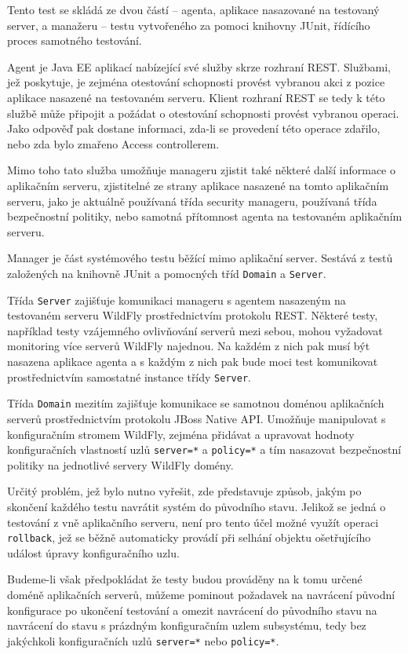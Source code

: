 Tento test se skládá ze dvou částí -- agenta, aplikace nasazované na testovaný server, a manažeru -- testu vytvořeného za pomoci knihovny JUnit, řídícího proces samotného testování.

Agent je Java EE aplikací nabízející své služby skrze rozhraní REST. Službami, jež poskytuje, je zejména otestování schopnosti provést vybranou akci z pozice aplikace nasazené na testovaném serveru. Klient rozhraní REST se tedy k této službě může připojit a požádat o otestování schopnosti provést vybranou operaci. Jako odpověď pak dostane informaci, zda-li se provedení této operace zdařilo, nebo zda bylo zmařeno Access controllerem.

Mimo toho tato služba umožňuje manageru zjistit také některé další informace o aplikačním serveru, zjistitelné ze strany aplikace nasazené na tomto aplikačním serveru, jako je aktuálně používaná třída security manageru, používaná třída bezpečnostní politiky, nebo samotná přítomnost agenta na testovaném aplikačním serveru.

Manager je část systémového testu běžící mimo aplikační server. Sestává z testů založených na knihovně JUnit a pomocných tříd {\tt Domain} a {\tt Server}.

Třída {\tt Server} zajišťuje komunikaci manageru s agentem nasazeným na testovaném serveru WildFly prostřednictvím protokolu REST. Některé testy, například testy vzájemného ovlivňování serverů mezi sebou, mohou vyžadovat monitoring více serverů WildFly najednou. Na každém z nich pak musí být nasazena aplikace agenta a s každým z nich pak bude moci test komunikovat prostřednictvím samostatné instance třídy {\tt Server}.

Třída {\tt Domain} mezitím zajišťuje komunikace se samotnou doménou aplikačních serverů prostřednictvím protokolu JBoss Native API. Umožňuje manipulovat s konfiguračním stromem WildFly, zejména přidávat a upravovat hodnoty konfiguračních vlastností uzlů {\tt server=*} a {\tt policy=*} a tím nasazovat bezpečnostní politiky na jednotlivé servery WildFly domény.

Určitý problém, jež bylo nutno vyřešit, zde představuje způsob, jakým po skončení každého testu navrátit systém do původního stavu. Jelikož se jedná o testování z vně aplikačního serveru, není pro tento účel možné využít operaci {\tt rollback}, jež se běžně automaticky provádí při selhání objektu ošetřujícího událost úpravy konfiguračního uzlu.

Budeme-li však předpokládat že testy budou prováděny na k tomu určené doméně aplikačních serverů, můžeme pominout požadavek na navrácení původní konfigurace po ukončení testování a omezit navrácení do původního stavu na navrácení do stavu s prázdným konfiguračním uzlem subsystému, tedy bez jakýchkoli konfiguračních uzlů 
{\tt server=*} nebo {\tt policy=*}.

